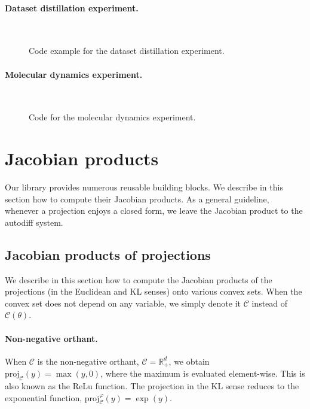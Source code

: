 \documentclass{article}
\def\cC{{\mathcal{C}}}
\def\RR{{\mathbb R}}
\def\proj{{\text{proj}}}
\begin{document}
\paragraph{Dataset distillation experiment.}

~

\begin{figure}[H]
\centering
{}
\caption{Code example for the dataset distillation experiment.}
\label{fig:distillation_code}
\end{figure}

\paragraph{Molecular dynamics experiment.}

~

\begin{figure}[H]
\centering
{}
\caption{Code for the molecular dynamics experiment.}
\label{fig:md_code}
\end{figure}

\section{Jacobian products}
\label{appendix:jac_prod}

Our library provides numerous reusable building blocks.
We describe in this section how to compute their Jacobian products.
As a general guideline, whenever a projection enjoys a closed form, we leave the
Jacobian product to the autodiff system.  

\subsection{Jacobian products of projections}
\label{sec:jacobians_proj}

We describe in this section how to compute the Jacobian products of the
projections (in the Euclidean and KL senses) onto various convex sets.  
When the convex set does not depend on any variable, we simply denote
it $\cC$ instead of $\cC(\theta)$.

\paragraph{Non-negative orthant.}

When $\cC$ is the non-negative orthant, $\cC = \RR^d_+$, we obtain
$\proj_\cC(y) = \max(y, 0)$,
where the maximum is evaluated element-wise. This is also known as the ReLu
function. The projection in the KL sense reduces to the exponential function,
$\proj^\varphi_\cC(y) = \exp(y)$.
\end{document}

